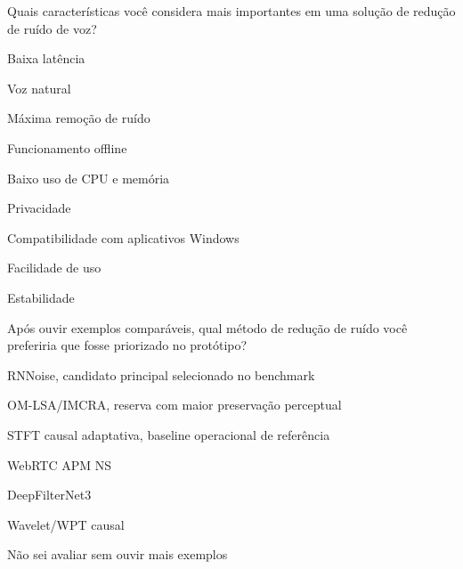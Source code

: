 \begin{perguntaFormulario}{Quais características você considera mais importantes em uma solução de redução de ruído de voz?}
\begin{opcoesFormularioDuasColunas}
    \item Baixa latência
    \item Voz natural
    \item Máxima remoção de ruído
    \item Funcionamento offline
    \item Baixo uso de CPU e memória
    \item Privacidade
    \item Compatibilidade com aplicativos Windows
    \item Facilidade de uso
    \item Estabilidade
\end{opcoesFormularioDuasColunas}
\end{perguntaFormulario}

\begin{perguntaFormulario}{Após ouvir exemplos comparáveis, qual método de redução de ruído você preferiria que fosse priorizado no protótipo?}
\begin{opcoesFormulario}
    \item RNNoise, candidato principal selecionado no benchmark
    \item OM-LSA/IMCRA, reserva com maior preservação perceptual
    \item STFT causal adaptativa, baseline operacional de referência
    \item WebRTC APM NS
    \item DeepFilterNet3
    \item Wavelet/WPT causal
    \item Não sei avaliar sem ouvir mais exemplos
\end{opcoesFormulario}
\end{perguntaFormulario}


